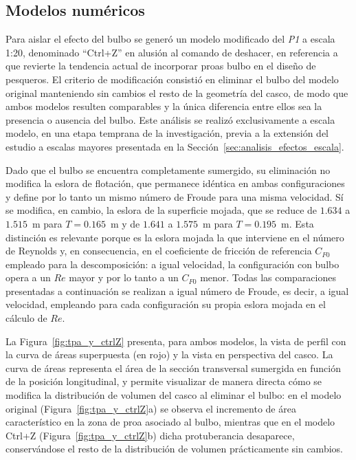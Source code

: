 \subsection{Modelos numéricos}

Para aislar el efecto del bulbo se generó un modelo modificado del 
\textit{P1} a escala 1:20, denominado ``Ctrl+Z'' en alusión al comando de 
deshacer, en referencia a que revierte la tendencia actual de incorporar 
proas bulbo en el diseño de pesqueros. El criterio de modificación consistió 
en eliminar el bulbo del modelo original manteniendo sin cambios el resto de 
la geometría del casco, de modo que ambos modelos resulten comparables y la 
única diferencia entre ellos sea la presencia o ausencia del bulbo. Este 
análisis se realizó exclusivamente a escala modelo, en una etapa temprana de 
la investigación, previa a la extensión del estudio a escalas mayores 
presentada en la Sección~\ref{sec:analisis_efectos_escala}.

Dado que el bulbo se encuentra completamente sumergido, su eliminación no 
modifica la eslora de flotación, que permanece idéntica en ambas 
configuraciones y define por lo tanto un mismo número de Froude para una 
misma velocidad. Sí se modifica, en cambio, la eslora de la superficie mojada, que se reduce 
de $1{.}634$ a $1{.}515$~m para $T = 0{.}165$~m y de $1{.}641$ a $1{.}575$~m 
para $T = 0{.}195$~m. Esta distinción es relevante porque es la eslora 
mojada la que interviene en el número de Reynolds y, en consecuencia, en el 
coeficiente de fricción de referencia $C_{F0}$ empleado para la 
descomposición: a igual velocidad, la configuración con bulbo opera a un 
$Re$ mayor y por lo tanto a un $C_{F0}$ menor. Todas las comparaciones 
presentadas a continuación se realizan a igual número de Froude, es decir, a 
igual velocidad, empleando para cada configuración su propia eslora mojada 
en el cálculo de $Re$.

La Figura~\ref{fig:tpa_y_ctrlZ} presenta, para ambos modelos, la vista de 
perfil con la curva de áreas superpuesta (en rojo) y la vista en perspectiva 
del casco. La curva de áreas representa el área de la sección transversal 
sumergida en función de la posición longitudinal, y permite visualizar de 
manera directa cómo se modifica la distribución de volumen del casco al 
eliminar el bulbo: en el modelo original (Figura~\ref{fig:tpa_y_ctrlZ}a) se 
observa el incremento de área característico en la zona de proa asociado al 
bulbo, mientras que en el modelo Ctrl+Z (Figura~\ref{fig:tpa_y_ctrlZ}b) dicha 
protuberancia desaparece, conservándose el resto de la distribución de 
volumen prácticamente sin cambios.

